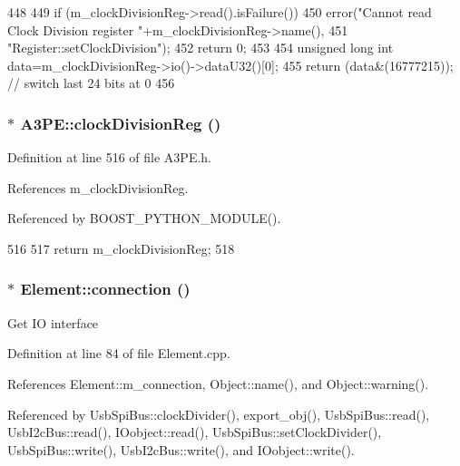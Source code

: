 \begin{DoxyCode}
448                                 {
449   if (m_clockDivisionReg->read().isFailure()){
450     error("Cannot read Clock Division register "+m_clockDivisionReg->name(),
451         "Register::setClockDivision");
452     return 0;
453   }
454   unsigned long int data=m_clockDivisionReg->io()->dataU32()[0];
455   return (data&(16777215)); // switch last 24 bits at 0
456 }
\end{DoxyCode}
\hypertarget{classA3PE_a10cf30ff852d7580ba94dbee0c48e0d5}{
\subsubsection[{clockDivisionReg}]{$\ast$ A3PE::clockDivisionReg ()}}
\label{classA3PE_a10cf30ff852d7580ba94dbee0c48e0d5}


Definition at line 516 of file A3PE.h.

References m\_\-clockDivisionReg.

Referenced by BOOST\_\-PYTHON\_\-MODULE().


\begin{DoxyCode}
516                               {
517     return m_clockDivisionReg;
518   }
\end{DoxyCode}
\hypertarget{classElement_af57444353c1ddf9fa0109801e97debf7}{
\subsubsection[{connection}]{ $\ast$ Element::connection ()}}
\label{classElement_af57444353c1ddf9fa0109801e97debf7}
Get IO interface 

Definition at line 84 of file Element.cpp.

References Element::m\_\-connection, Object::name(), and Object::warning().

Referenced by UsbSpiBus::clockDivider(), export\_\-obj(), UsbSpiBus::read(), UsbI2cBus::read(), IOobject::read(), UsbSpiBus::setClockDivider(), UsbSpiBus::write(), UsbI2cBus::write(), and IOobject::write().


